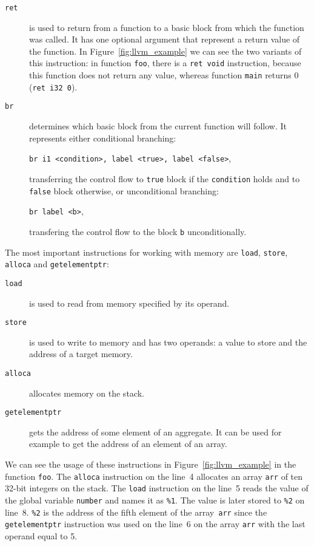 \begin{description}
\item[\texttt{ret}] is used to return from a function to a basic block
from which the function was called. It has one optional argument that represent
a return value of the function. In Figure~\ref{fig:llvm_example} we can see the
two variants of this instruction: in function \texttt{foo}, there is a
\texttt{ret void} instruction, because this function does not return any value,
whereas function \texttt{main} returns 0 (\texttt{ret i32 0}).

\item[\texttt{br}] determines which basic block from the current function
will follow. It represents either conditional branching:

\texttt{br i1 <condition>, label <true>, label <false>},

transferring the control flow to \texttt{true} block if the \texttt{condition} holds and to
\texttt{false} block otherwise, or unconditional branching:

\texttt{br label <b>},

transfering the control flow to the block \texttt{b} unconditionally.
\end{description}

The most important instructions for working with memory are \texttt{load},
\texttt{store}, \texttt{alloca} and \texttt{getelementptr}:
\begin{description}
\item[\texttt{load}] is used to read from memory specified by its operand.
\item[\texttt{store}] is used to write to memory and has two operands: a value
to store and the address of a target memory.
\item[\texttt{alloca}] allocates memory on the stack.
\item[\texttt{getelementptr}] gets the address of some element of an aggregate.
It can be used for example to get the address of an element of an array.
\end{description}
We can see the usage of these instructions in Figure~\ref{fig:llvm_example} in
the function \texttt{foo}. The \texttt{alloca} instruction on the line~4 allocates an
array \texttt{arr} of ten 32-bit integers on the stack. The \texttt{load}
instruction on the line~5 reads the value of the global variable \texttt{number} and
names it as \texttt{\%1}. The value is later stored to \texttt{\%2} on line~8.
\texttt{\%2} is the address of the fifth element of the array~\texttt{arr} since the
\texttt{getelementptr} instruction was used on the line~6 on the array \texttt{arr}
with the last operand equal to 5.

